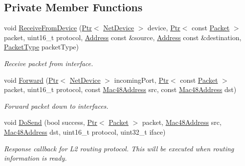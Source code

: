 \subsection*{Private Member Functions}
\begin{DoxyCompactItemize}
\item 
void \hyperlink{classns3_1_1MeshPointDevice_a4d34699068f61ebcbb610c650b28af6b}{Receive\+From\+Device} (\hyperlink{classns3_1_1Ptr}{Ptr}$<$ \hyperlink{classns3_1_1NetDevice}{Net\+Device} $>$ device, \hyperlink{classns3_1_1Ptr}{Ptr}$<$ const \hyperlink{classns3_1_1Packet}{Packet} $>$ packet, uint16\+\_\+t protocol, \hyperlink{classns3_1_1Address}{Address} const \&source, \hyperlink{classns3_1_1Address}{Address} const \&destination, \hyperlink{classns3_1_1NetDevice_ace65153f09144f55a0d3e702fc29d6b2}{Packet\+Type} packet\+Type)
\begin{DoxyCompactList}\small\item\em Receive packet from interface. \end{DoxyCompactList}\item 
void \hyperlink{classns3_1_1MeshPointDevice_a8c13c74a516103913d7e852159e47d7d}{Forward} (\hyperlink{classns3_1_1Ptr}{Ptr}$<$ \hyperlink{classns3_1_1NetDevice}{Net\+Device} $>$ incoming\+Port, \hyperlink{classns3_1_1Ptr}{Ptr}$<$ const \hyperlink{classns3_1_1Packet}{Packet} $>$ packet, uint16\+\_\+t protocol, const \hyperlink{classns3_1_1Mac48Address}{Mac48\+Address} src, const \hyperlink{classns3_1_1Mac48Address}{Mac48\+Address} dst)
\begin{DoxyCompactList}\small\item\em Forward packet down to interfaces. \end{DoxyCompactList}\item 
void \hyperlink{classns3_1_1MeshPointDevice_a01489a62c62337339cf7dc8654849964}{Do\+Send} (bool success, \hyperlink{classns3_1_1Ptr}{Ptr}$<$ \hyperlink{classns3_1_1Packet}{Packet} $>$ packet, \hyperlink{classns3_1_1Mac48Address}{Mac48\+Address} src, \hyperlink{classns3_1_1Mac48Address}{Mac48\+Address} dst, uint16\+\_\+t protocol, uint32\+\_\+t iface)
\begin{DoxyCompactList}\small\item\em Response callback for L2 routing protocol. This will be executed when routing information is ready. \end{DoxyCompactList}\end{DoxyCompactItemize}
